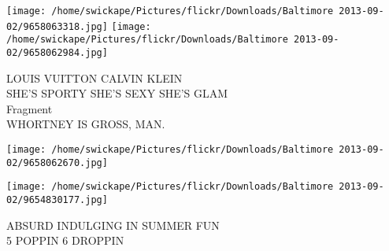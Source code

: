 \documentclass[10pt,letterpaper]{article}
\begin{document}
\texttt{[image: /home/swickape/Pictures/flickr/Downloads/Baltimore 2013-09-02/9658063318.jpg]}
\texttt{[image: /home/swickape/Pictures/flickr/Downloads/Baltimore 2013-09-02/9658062984.jpg]}

LOUIS VUITTON CALVIN KLEIN\\
SHE'S SPORTY SHE'S SEXY SHE'S GLAM\\
Fragment\\
WHORTNEY IS GROSS, MAN.
\pagebreak

\texttt{[image: /home/swickape/Pictures/flickr/Downloads/Baltimore 2013-09-02/9658062670.jpg]}

\vspace{0.25in}
\texttt{[image: /home/swickape/Pictures/flickr/Downloads/Baltimore 2013-09-02/9654830177.jpg]}

ABSURD INDULGING IN SUMMER FUN\\
5 POPPIN 6 DROPPIN
\pagebreak
\end{document}
